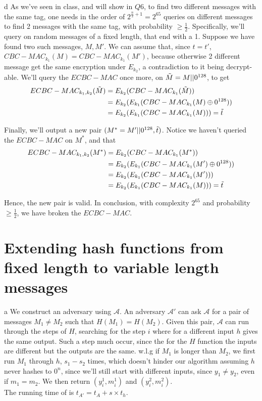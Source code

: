\documentclass{article}
\begin{document}
\begin{paragraph}
    d As we've seen in class, and will show in $Q6$, to find two different messages with the same tag, one needs in the order of $2^{\frac{n}{2} + 1} = 2^{65}$ queries on different messages to find 2 messages with the same tag, with probability $\geq \frac{1}{2}$. Specifically, we'll query on random messages of a fixed length, that end with a 1. Suppose we have found two such messages, $M, M'$. We can assume that, since $t = t'$, $CBC-MAC_{k_1}(M) = CBC-MAC_{k_1}(M')$, because otherwise 2 different message get the same encryption under $E_{k_2}$, a contradiction to it being decrypt-able. We'll query the $ECBC-MAC$ once more, on $\Tilde{M} = M || 0^{128}$, to get
    \begin{align*}
        ECBC-MAC_{k_1, k_2}(\Tilde{M}) &= E_{k_2}(CBC-MAC_{k_1}(\Tilde{M}))\\
        &= E_{k_2}(E_{k_1}(CBC-MAC_{k_1}(M) \oplus 0^{128}))\\
        &= E_{k_2}(E_{k_1}(CBC-MAC_{k_1}(M))) = \Tilde{t}
    \end{align*}
    
    Finally, we'll output a new pair $(M^* = M' || 0^{128}, \Tilde{t})$. Notice we haven't queried the $ECBC-MAC$ on $M^*$, and that
    \begin{align*}
        ECBC-MAC_{k_1, k_2}(M^*) &= E_{k_2}(CBC-MAC_{k_1}(M^*))\\
        &= E_{k_2}(E_{k_1}(CBC-MAC_{k_1}(M') \oplus 0^{128}))\\
        &= E_{k_2}(E_{k_1}(CBC-MAC_{k_1}(M')))\\
        &= E_{k_2}(E_{k_1}(CBC-MAC_{k_1}(M))) = \Tilde{t}
    \end{align*}
    
    Hence, the new pair is valid. In conclusion, with complexity $2^{65}$ and probability $\geq \frac{1}{2}$, we have broken the $ECBC-MAC$.
\end{paragraph}

\section{Extending hash functions from fixed length to variable length messages}
\begin{paragraph}
	a We construct an adversary using $\mathcal{A}$. An adversary $\mathcal{A'}$ can
	ask $\mathcal{A}$ for a pair of messages $M_1 \neq M_2$ such that $H(M_1) = H(M_2)$.
	Given this pair, $\mathcal{A}$ can run through the steps of $H$,
	searching for the step $i$ where for a different input $h$ gives the same output.
	Such a step much occur, since the for the $H$ function the inputs are different
	but the outputs are the same.
	w.l.g if $M_1$ is longer than $M_2$, we first run $M_1$ through $h$, $s_1 - s_2$
	times, which doesn't hinder our	algorithm assuming $h$ never hashes to $0^n$, since 
	we'll still start with different inputs, since $y_1 \neq y_2$, even if $m_1 = m_2$.
	We then return $(y_i^1, m_i^1)$ and $(y_i^2, m_i^2)$.\\
	The running time of is $t_{A'} = t_A + s\times t_h$.
\end{paragraph}
\end{document}
